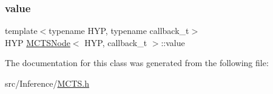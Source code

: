 \subsubsection{\texorpdfstring{value}{value}}
{\footnotesize\ttfamily template$<$typename H\+YP, typename callback\+\_\+t$>$ \\
H\+YP \hyperlink{class_m_c_t_s_node}{M\+C\+T\+S\+Node}$<$ H\+YP, callback\+\_\+t $>$\+::value}



The documentation for this class was generated from the following file\+:\begin{DoxyCompactItemize}
\item 
src/\+Inference/\hyperlink{_m_c_t_s_8h}{M\+C\+T\+S.\+h}\end{DoxyCompactItemize}
